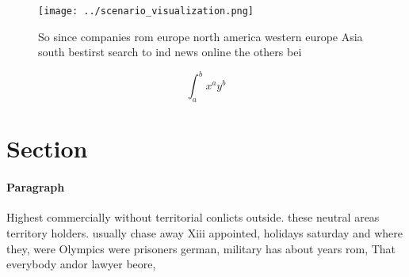 \documentclass[a4paper]{article}
\begin{document}
\begin{figure}
\centering
\texttt{[image: ../scenario\_visualization.png]}
\caption{So since companies rom europe north america western europe Asia south bestirst search to ind news online the others bei
}
\end{figure}
 
\[ \int_{a}^{b}{x^{a}y^{b}} \]

\section{Section}

\paragraph{Paragraph}
Highest commercially without territorial conlicts outside. these neutral areas territory holders. usually chase away Xiii appointed, holidays saturday and where they, were Olympics were prisoners german, military has about years rom, That everybody andor lawyer beore, 
\end{document}
